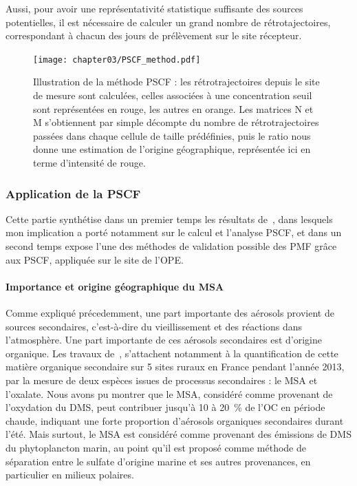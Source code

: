 Aussi, pour avoir une représentativité statistique suffisante des sources potentielles, il
est nécessaire de calculer un grand nombre de rétrotajectoires, correspondant à chacun des
jours de prélèvement sur le site récepteur.

\begin{figure}[ht]
    \centering
    \texttt{[image: chapter03/PSCF\_method.pdf]}
    \caption{Illustration de la méthode PSCF : les rétrotrajectoires depuis le site de
        mesure sont calculées, celles associées à une concentration seuil sont
        représentées en rouge, les autres en orange. Les matrices N et M s'obtiennent par
        simple décompte du nombre de rétrotrajectoires passées dans chaque cellule de
        taille prédéfinies, puis le ratio nous donne une estimation de l'origine
    géographique, représentée ici en terme d'intensité de rouge.}%
    \label{fig:chapter02/PSCF_method}
\end{figure}

\subsubsection{Application de la PSCF}%
\label{ssub:application_de_la_pscf}

\begin{tcolorbox}[colback=red!5!white,colframe=Melon,title=Note]
Cette partie synthétise dans un premier temps les résultats de~\cite{gollyOrganic2019},
dans lesquels mon implication a porté notamment sur le calcul et l'analyse PSCF, et dans
un second temps expose l'une des méthodes de validation possible des PMF grâce aux PSCF,
appliquée sur le site de l'OPE.
\end{tcolorbox}

\paragraph{Importance et origine géographique du MSA}%
\label{par:origine_terrestre_ou_marine_du_msa_}

Comme expliqué précedemment, une part importante des aérosols provient de sources
secondaires, c'est-à-dire du vieillissement et des réactions dans l'atmosphère. Une part
importante de ces aérosols secondaires est d'origine organique. Les travaux
de~\textcite{gollyOrganic2019}, s'attachent notamment à la quantification de cette matière
organique secondaire sur 5 sites ruraux en France pendant l'année 2013, par la mesure de
deux espèces issues de processus secondaires : le MSA et l'oxalate.  Nous avons pu montrer
que le MSA, considéré comme provenant de l'oxydation du DMS, peut contribuer jusqu'à 10 à
\SI{20}{\percent} de l'OC en période chaude, indiquant une forte proportion d'aérosols organiques
secondaires durant l'été. Mais surtout, le MSA est considéré comme provenant des émissions
de DMS du phytoplancton marin, au point qu'il est proposé comme méthode de séparation
entre le sulfate d'origine marine et ses autres provenances, en particulier en milieux
polaires.

